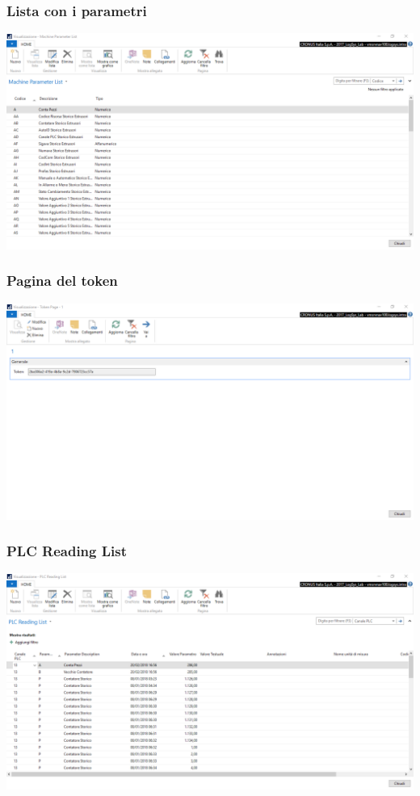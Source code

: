 \documentclass{beamer}
\begin{document}
\begin{frame}
\frametitle{Lista con i parametri}
\includegraphics[width=1\textwidth]{images/MachineParameter.png}
\end{frame}

\begin{frame}
\frametitle{Pagina del token}
\includegraphics[width=1\textwidth]{images/tokenpage.png}
\end{frame}



\begin{frame}
\frametitle{PLC Reading List}
\includegraphics[width=1\textwidth]{images/PLCReadingList.png}
\end{frame}
\end{document}
